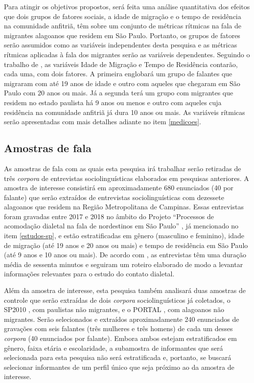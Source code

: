 \documentclass[
	a4paper,	%
	12pt,		%
	]{article}	%
\begin{document}
	Para atingir os objetivos propostos, será feita uma análise quantitativa dos efeitos que dois
	grupos de fatores sociais, a idade de migração e o tempo de residência na comunidade anfitriã,
	têm sobre um conjunto de métricas rítmicas na fala de migrantes alagoanos que residem em São
	Paulo. Portanto, os grupos de fatores serão assumidos como as variáveis independentes desta
	pesquisa e as métricas rítmicas aplicadas à fala dos migrantes serão as variáveis dependentes.
	Seguindo o trabalho de \citet{Oushiro2018}, as variáveis Idade de Migração e Tempo de Residência
	contarão, cada uma, com dois fatores. A primeira englobará um grupo de falantes que migraram com
	até 19 anos de idade  e outro com aqueles que chegaram em São Paulo com 20 anos ou mais. Já a
	segunda terá um grupo com migrantes que residem no estado paulista há 9 anos ou menos e outro
	com aqueles cuja residência na comunidade anfitriã já dura 10 anos ou mais. As variáveis
	rítmicas serão apresentadas com mais detalhes adiante no item \ref{medicoes}.

	\subsection{Amostras de fala} 
	\label{amostra}
	
	As amostras de fala com as quais esta pesquisa irá trabalhar serão retiradas de três
	\emph{corpora} de entrevistas sociolinguísticas elaborados em pesquisas anteriores. A amostra de
	interesse consistirá em aproximadamente 680 enunciados (40 por falante) que serão extraídos de
	entrevistas sociolinguísticas com dezessete alagoanos que residem na Região Metropolitana de
	Campinas.  Essas entrevistas foram gravadas entre 2017 e 2018 no âmbito do Projeto
	\enquote{Processos de acomodação dialetal na fala de nordestinos em São Paulo}
	\citep{Oushiro2018}, já mencionado no item \ref{estudos-sp}, e estão estratificadas em gênero
	(masculino e feminino), idade de migração (até 19 anos e 20 anos ou mais) e tempo de residência
	em São Paulo (até 9 anos e 10 anos ou mais). De acordo com \citet{Oushiro2018}, as entrevistas
	têm uma duração média de sessenta minutos e seguiram um roteiro elaborado de modo a levantar
	informações relevantes para o estudo do contato dialetal.

	Além da amostra de interesse, esta pesquisa também analisará duas amostras de controle que serão
	extraídas de dois \emph{corpora} sociolinguísticos já coletados, o SP2010
	\citep{Mendes.Oushiro2012}, com paulistas não migrantes, e o PORTAL \citep{Oliveira2017}, com
	alagoanos não migrantes. Serão selecionados e extraídos aproximadamente 240 enunciados de
	gravações com seis falantes (três mulheres e três homens) de cada um desses \emph{corpora} (40
	enunciados por falante). Embora ambos estejam estratificados em gênero, faixa etária e
	escolaridade, a subamostra de informantes que será selecionada para esta pesquisa não será
	estratificada e, portanto, se buscará selecionar informantes de um perfil único que seja próximo
	ao da amostra de interesse.
\end{document}
